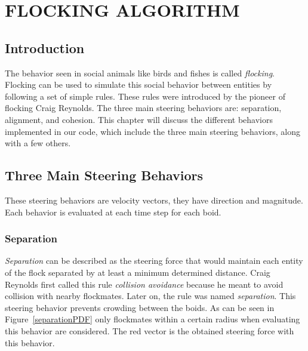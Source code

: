 \chapter{FLOCKING ALGORITHM}

\section{Introduction}
The behavior seen in social animals like birds and fishes is called \textit{flocking}. Flocking can be used to simulate this social behavior between entities by following a set of simple rules. These rules were introduced by the pioneer of flocking Craig Reynolds\cite{craig1}. The three main steering behaviors are: separation, alignment, and cohesion. This chapter will discuss the different behaviors implemented in our code, which include the three main steering behaviors, along with a few others.

\section{Three Main Steering Behaviors}
These steering behaviors are velocity vectors, they have direction and magnitude. Each behavior is evaluated at each time step for each boid.

\subsection{Separation}\label{separationsection}
\textit{Separation} can be described as the steering force that would maintain each entity of the flock separated by at least a minimum determined distance. Craig Reynolds first called this rule \textit{collision avoidance} because he meant to avoid collision with nearby flockmates. Later on, the rule was named \textit{separation}. This steering behavior prevents crowding between the boids. As can be seen in Figure~\ref{separationPDF} only flockmates within a certain radius when evaluating this behavior are considered. The red vector is the obtained steering force with this behavior.

